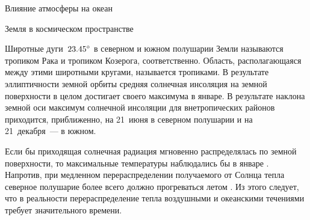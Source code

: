 \begin{chapter}{Влияние атмосферы на океан}
\begin{section}{Земля в космическом пространстве}

Широтные дуги~${23.45}^\circ$ в северном и южном полушарии Земли
называются тропиком Рака и тропиком Козерога, соответственно. Область,
располагающаяся между этими широтными кругами, называется тропиками. В
результате эллиптичности земной орбиты средняя солнечная
инсоляция на земной поверхности в целом достигает своего максимума в январе. В
результате наклона земной оси максимум солнечной инсоляции для
внетропических районов приходится, приближенно, на 21~июня в северном полушарии 
и на 21~декабря~--- в южном.
%

Если бы приходящая солнечная радиация мгновенно распределялась по
земной поверхности, то максимальные температуры наблюдались бы в
январе%
. 
Напротив, при медленном перераспределении получаемого от Солнца тепла северное
полушарие более всего должно прогреваться летом%
. 
Из этого следует, что в
реальности перераспределение тепла воздушными и океанскими течениями
требует значительного времени.
%
\end{section}


\end{chapter}

